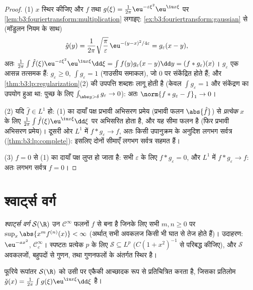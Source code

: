 \begin{proof}
(1) $x$ स्थिर कीजिए और $f$ तथा $g(\xi) = \frac1{2\pi}\eu^{-\varepsilon\xi^2}\eu^{\iu x\xi}$ पर \cref{lem:b3:fouriertransform:multiplication} लगाइए: \cref{ex:b3:fouriertransform:gaussian} से
(मॉडुलन नियम के साथ)
\[
\hat g(y) = \frac1{2\pi}\sqrt{\frac\pi\varepsilon}\,
\eu^{-(y - x)^2/4\varepsilon} = g_\varepsilon(x - y),
\]
अतः $\frac1{2\pi}\int\hat f(\xi)\eu^{-\varepsilon\xi^2}
\eu^{\iu x\xi}\dd\xi = \int f(y)g_\varepsilon(x - y)\dd y =
(f*g_\varepsilon)(x)$। $g_\varepsilon$ एक आसन्न तत्समक हैं: $g_\varepsilon \geq 0$, $\int g_\varepsilon = 1$ (गाउसीय समाकल), जो
$0$ पर संकेंद्रित होते हैं; और \cref{thm:b3:lp:regularization}(2) की उपपत्ति शब्दशः लागू
होती है (केवल $\int g_\varepsilon = 1$ और संकेंद्रण का उपयोग हुआ था: पुच्छ के लिए
$\int_{\abs y > \delta}g_\varepsilon \to
0$): अतः $\norm{f * g_\varepsilon - f}_1 \to 0$।

(2) यदि $\hat f \in L^1$ हो: (1) का दायाँ पक्ष प्रभावी अभिसरण प्रमेय (प्रभावी
फलन $\abs{\hat f}$) से \emph{प्रत्येक} $x$ के लिए $\frac1{2\pi}\int\hat
f(\xi)\eu^{\iu x\xi}\dd\xi$ पर अभिसरित होता है,
और यह सीमा फलन  है (फिर प्रभावी अभिसरण प्रमेय)। दूसरी ओर
$L^1$ में $f
* g_\varepsilon \to f$, अतः किसी उपानुक्रम के अनुदिश लगभग सर्वत्र
(\cref{thm:b3:lp:complete}): इसलिए दोनों सीमाएँ लगभग सर्वत्र सहमत हैं।

(3) $\hat f = 0$ से (1) का दायाँ पक्ष लुप्त हो जाता है: सभी $\varepsilon$ के लिए
$f *
g_\varepsilon = 0$, और $L^1$ में $f *
g_\varepsilon \to f$: अतः लगभग सर्वत्र $f = 0$।
\end{proof}

\section{श्वार्ट्स वर्ग}

\begin{definition}\label{def:b3:fouriertransform:schwartz}
\emph{श्वार्ट्स वर्ग} $\mathcal
S(\R)$ उन $\mathcal C^\infty$ फलनों
$f$ से बना है जिनके लिए सभी $m, n \geq 0$ पर $\sup_x\abs{x^m f^{(n)}(x)} < \infty$ (अर्थात् सभी अवकलज
किसी भी घात से तेज  होते हैं)। उदाहरण: $\eu^{-ax^2}$, $\mathcal C_c^\infty$। स्पष्टतः
प्रत्येक $p$ के लिए $\mathcal S
\subseteq L^p$ ($C(1 + x^2)^{-1}$ से परिबद्ध कीजिए), और $\mathcal S$
अवकलजों, बहुपदों से गुणन, तथा गुणनफलों के अंतर्गत स्थिर है।
\end{definition}

\begin{theorem}\label{thm:b3:fouriertransform:schwartz}
फूरिये रूपांतर $\mathcal S(\R)$ को उसी पर एकैकी आच्छादक रूप से प्रतिचित्रित
करता है, जिसका प्रतिलोम $\check g(x) = \frac1{2\pi}\int
g(\xi)\eu^{\iu x\xi}\dd\xi$ है।
\end{theorem}

